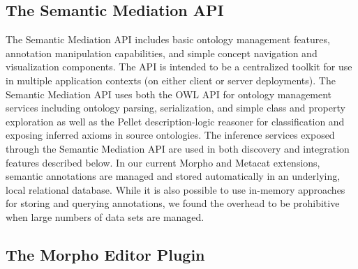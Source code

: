 \subsection{The Semantic Mediation API} 

The Semantic Mediation API includes basic ontology management
features, annotation manipulation capabilities, and simple concept
navigation and visualization components. The API is intended to be a
centralized toolkit for use in multiple application contexts (on
either client or server deployments).  The Semantic Mediation API uses
both the OWL API \cite{owlapi} for ontology management services
including ontology parsing, serialization, and simple class and
property exploration as well as the Pellet description-logic reasoner
\cite{pellet} for classification and exposing inferred axioms in
source ontologies. The inference services exposed through the Semantic
Mediation API are used in both discovery and integration features
described below.
In our current Morpho and Metacat extensions, semantic annotations are
managed and stored automatically in an underlying, local relational
database. While it is also possible to use in-memory approaches for
storing and querying annotations, we found the overhead to be
prohibitive when large numbers of data sets are managed.




\subsection{The Morpho Editor Plugin}

